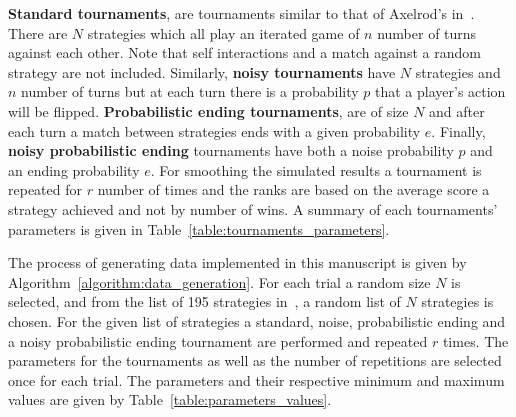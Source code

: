 \documentclass{article}
\begin{document}
\textbf{Standard tournaments}, are tournaments similar to that of Axelrod's
in~\cite{Axelrod1980a}. There are \(N\) strategies which all play an iterated
game of \(n\) number of turns against each other. Note that self interactions and
a match against a random strategy are not included. Similarly, \textbf{noisy tournaments}
have \(N\) strategies and \(n\) number of turns but at each turn there is a
probability \(p\) that a player's action will be flipped.
\textbf{Probabilistic ending tournaments}, are of size \(N\) and after each turn
a match between strategies ends with a given probability \(e\). Finally,
\textbf{noisy probabilistic ending} tournaments have both a noise probability
\(p\) and an ending probability \(e\). For smoothing the simulated results a
tournament is repeated for \(r\) number of times and the ranks are based on the
average score a strategy achieved and not by number of wins. A summary of
each tournaments' parameters is given in Table~\ref{table:tournaments_parameters}.

\begin{table}[!htbp]
    \begin{center}
    \end{center}
    \caption{Tournament types' parameters.}
    \label{table:tournaments_parameters}
\end{table}

The process of generating data implemented in this manuscript is given by
Algorithm~\ref{algorithm:data_generation}. For each trial a random
size \(N\) is selected, and from the list of 195 strategies
in~\cite{axelrodproject}, a random list of \(N\) strategies is chosen. For the
given list of strategies a standard, noise, probabilistic ending and a noisy
probabilistic ending tournament are performed and repeated \(r\) times.
The parameters for the tournaments as well as the number of repetitions are
selected once for each trial. The parameters and their respective minimum and
maximum values are given by Table~\ref{table:parameters_values}.
\end{document}
